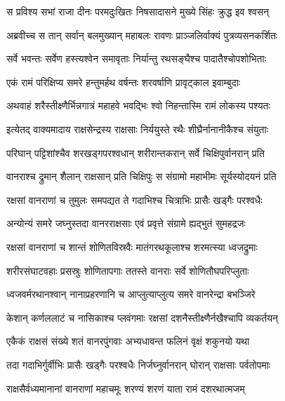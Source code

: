 
\twolineshloka
{स प्रविश्य सभां राजा दीनः परमदुःखितः}
{निषसादासने मुख्ये सिंहः क्रुद्ध इव श्वसन्} %

\twolineshloka
{अब्रवीच्च स तान् सर्वान् बलमुख्यान् महाबलः}
{रावणः प्राञ्जलिर्वाक्यं पुत्रव्यसनकर्शितः} %

\twolineshloka
{सर्वे भवन्तः सर्वेण हस्त्यश्वेन समावृताः}
{निर्यान्तु रथसङ्घैश्च पादातैश्चोपशोभिताः} %

\twolineshloka
{एकं रामं परिक्षिप्य समरे हन्तुमर्हथ}
{वर्षन्तः शरवर्षाणि प्रावृट्काल इवाम्बुदाः} %

\twolineshloka
{अथवाहं शरैस्तीक्ष्णैर्भिन्नगात्रं महाहवे}
{भवद्भिः श्वो निहन्तास्मि रामं लोकस्य पश्यतः} %

\twolineshloka
{इत्येतद् वाक्यमादाय राक्षसेन्द्रस्य राक्षसाः}
{निर्ययुस्ते रथैः शीघ्रैर्नानानीकैश्च संयुताः} %

\twolineshloka
{परिघान् पट्टिशांश्चैव शरखड्गपरश्वधान्}
{शरीरान्तकरान् सर्वे चिक्षिपुर्वानरान् प्रति} %

\twolineshloka
{वानराश्च द्रुमान् शैलान् राक्षसान् प्रति चिक्षिपुः}
{स संग्रामो महाभीमः सूर्यस्योदयनं प्रति} %

\twolineshloka
{रक्षसां वानराणां च तुमुलः समपद्यत}
{ते गदाभिश्च चित्राभिः प्रासैः खड्गैः परश्वधैः} %

\twolineshloka
{अन्योन्यं समरे जघ्नुस्तदा वानरराक्षसाः}
{एवं प्रवृत्ते संग्रामे ह्यद्भुतं सुमहद्रजः} %

\twolineshloka
{रक्षसां वानराणां च शान्तं शोणितविस्रवैः}
{मातंगरथकूलाश्च शरमत्स्या ध्वजद्रुमाः} %

\twolineshloka
{शरीरसंघाटवहाः प्रसस्रुः शोणितापगाः}
{ततस्ते वानराः सर्वे शोणितौघपरिप्लुताः} %

\twolineshloka
{ध्वजवर्मरथानश्वान् नानाप्रहरणानि च}
{आप्लुत्याप्लुत्य समरे वानरेन्द्रा बभञ्जिरे} %

\twolineshloka
{केशान् कर्णललाटं च नासिकाश्च प्लवंगमाः}
{रक्षसां दशनैस्तीक्ष्णैर्नखैश्चापि व्यकर्तयन्} %

\twolineshloka
{एकैकं राक्षसं संख्ये शतं वानरपुंगवाः}
{अभ्यधावन्त फलिनं वृक्षं शकुनयो यथा} %

\twolineshloka
{तदा गदाभिर्गुर्वीभिः प्रासैः खड्गैः परश्वधैः}
{निर्जघ्नुर्वानरान् घोरान् राक्षसाः पर्वतोपमाः} %

\twolineshloka
{राक्षसैर्वध्यमानानां वानराणां महाचमूः}
{शरण्यं शरणं याता रामं दशरथात्मजम्} %

